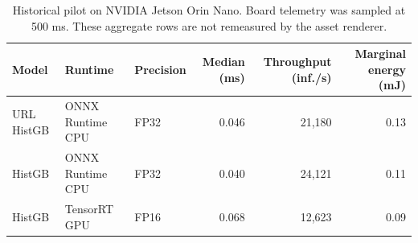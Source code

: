 \begin{table}[t]
\caption{Historical pilot on NVIDIA Jetson Orin Nano. Board telemetry was sampled at 500 ms. These aggregate rows are not remeasured by the asset renderer.}
\label{tab:pilot}
\centering\small
\begin{tabular}{@{}lllrrr@{}}
\toprule
Model & Runtime & Precision & Median (ms) & Throughput (inf./s) & Marginal energy (mJ) \\
\midrule
URL HistGB & ONNX Runtime CPU & FP32 & 0.046 & 21,180 & 0.13 \\
HistGB & ONNX Runtime CPU & FP32 & 0.040 & 24,121 & 0.11 \\
HistGB & TensorRT GPU & FP16 & 0.068 & 12,623 & 0.09 \\
\bottomrule
\end{tabular}
\end{table}
